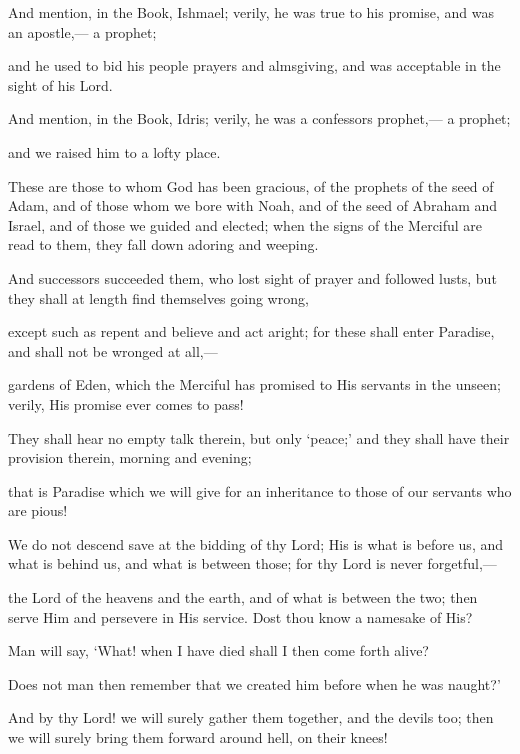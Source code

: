 \documentclass[fontsize=14pt, letterpaper, notitlepage, openany, DIV=12]{scrbook} %
\begin{document}
\noindent[19:54]
And mention, in the Book, Ishmael; verily, he was true to his promise, and was an
apostle,--- a prophet;

\noindent[19:55]
and he used to bid his people prayers and almsgiving, and was acceptable in the sight of
his Lord.

\noindent[19:56]
And mention, in the Book, Idris; verily, he was a confessors prophet,--- a prophet;

\noindent[19:57]
and we raised him to a lofty place.

\noindent[19:58]
These are those to whom God has been gracious, of the prophets of the seed of Adam,
and of those whom we bore with Noah, and of the seed of Abraham and Israel, and of those we
guided and elected; when the signs of the Merciful are read to them, they fall down adoring and
weeping.

\noindent[19:59]
And successors succeeded them, who lost sight of prayer and followed lusts, but they
shall at length find themselves going wrong,

\noindent[19:60]
except such as repent and believe and act aright; for these shall enter Paradise, and shall
not be wronged at all,---

\noindent[19:61]
gardens of Eden, which the Merciful has promised to His servants in the unseen; verily,
His promise ever comes to pass!

\noindent[19:62]
They shall hear no empty talk therein, but only `peace;' and they shall have their
provision therein, morning and evening;

\noindent[19:63]
that is Paradise which we will give for an inheritance to those of our servants who are
pious!

\noindent[19:64]
We do not descend save at the bidding of thy Lord; His is what is before us, and what is
behind us, and what is between those; for thy Lord is never forgetful,---

\noindent[19:65]
the Lord of the heavens and the earth, and of what is between the two; then serve Him
and persevere in His service. Dost thou know a namesake of His?

\noindent[19:66]
Man will say, `What! when I have died shall I then come forth alive?

\noindent[19:67]
Does not man then remember that we created him before when he was naught?'

\noindent[19:68]
And by thy Lord! we will surely gather them together, and the devils too; then we will
surely bring them forward around hell, on their knees!
\end{document}
